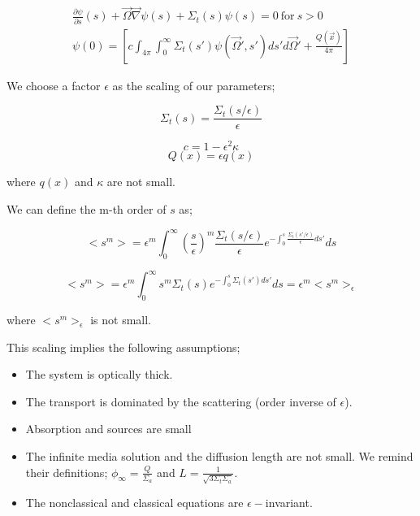 \documentclass[a4paper, 12pt]{report}
\newcommand{\bl}{\big<}
\newcommand{\bg}{\big>}
\begin{document}
\begin{appendix}
\begin{align}
\frac{\partial \psi}{\partial s} (s) + \vec{\Omega}\vec{\nabla}\psi(s) + \Sigma_t(s)\psi(s)=0 \ \text{for} \ s>0 \\
\psi(0) = \left[ c \int_{4\pi} \int_0^\infty \Sigma_t(s')\psi(\vec{\Omega}',s')ds'd\vec{\Omega}' + \frac{Q(\vec{x})}{4\pi} \right]
\end{align}

We choose a factor $\epsilon$ as the scaling of our parameters;

\begin{equation}
\Sigma_t(s) = \frac{\Sigma_t(s/\epsilon)}{\epsilon}
\end{equation} 

\begin{equation}
c = 1 - \epsilon^2\kappa
\end{equation}
\begin{equation}
Q(x) = \epsilon q(x)
\end{equation}

where $q(x)$ and $\kappa$ are not small.

We can define the m-th order of $s$ as;

\begin{equation}
\bl s^m\bg = \epsilon^m \int_0^\infty \left(\frac{s}{\epsilon}\right)^m \frac{\Sigma_t(s/\epsilon)}{\epsilon}e^{-\int_0^s\frac{\Sigma_t(s'/\epsilon)}{\epsilon}ds'}ds
\end{equation}

\begin{equation}
\bl s^m\bg = \epsilon^m \int_0^\infty s^m \Sigma_t(s)e^{-\int_0^s\Sigma_t(s')ds'}ds = \epsilon^m \bl s^m\bg_\epsilon
\end{equation}

where $\bl s^m\bg_\epsilon$ is not small.

This scaling implies the following assumptions;

\begin{itemize}
\item The system is optically thick.
\item The transport is dominated by the scattering (order inverse of $\epsilon$).
\item Absorption and sources are small
\item The infinite media solution and the diffusion length are not small. We remind their definitions; $ \phi_\infty = \frac{Q}{\Sigma_a}$ and $L = \frac{1}{\sqrt{3\Sigma_t\Sigma_a}}$.
\item The nonclassical and classical equations are $\epsilon-$invariant.
\end{itemize}


\end{appendix}
\end{document}
